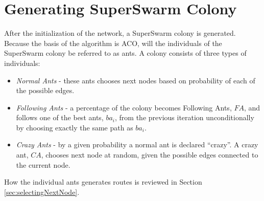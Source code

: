 \section{Generating SuperSwarm Colony}
\label{sec:algoGeneratingSuperSwarm}
After the initialization of the network, a SuperSwarm colony is generated. Because the basis of the algorithm is ACO, will the individuals of the SuperSwarm colony be referred to as ants. A colony consists of three types of individuals:
\begin{itemize}
\item \textit{Normal Ants} - these ants chooses next nodes based on probability of each of the possible edges. 
\item \textit{Following Ants} - a percentage of the colony becomes Following Ants, $FA$, and follows one of the best ants, $ba_i$, from the previous iteration unconditionally by choosing exactly the same path as $ba_i$.
\item \textit{Crazy Ants} - by a given probability a normal ant is declared ``crazy''. A crazy ant, $CA$, chooses next node at random, given the possible edges connected to the current node.  
\end{itemize}

How the individual ants generates routes is reviewed in Section \vref{sec:selectingNextNode}.
